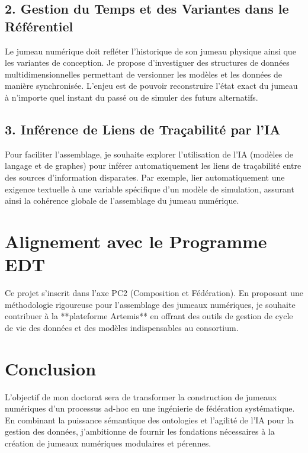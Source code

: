 \documentclass[11pt,a4paper]{article}
\begin{document}
\subsection{2. Gestion du Temps et des Variantes dans le Référentiel}
Le jumeau numérique doit refléter l'historique de son jumeau physique ainsi que les variantes de conception. Je propose d'investiguer des structures de données multidimensionnelles permettant de versionner les modèles et les données de manière synchronisée. L'enjeu est de pouvoir reconstruire l'état exact du jumeau à n'importe quel instant du passé ou de simuler des futurs alternatifs.

\subsection{3. Inférence de Liens de Traçabilité par l'IA}
Pour faciliter l'assemblage, je souhaite explorer l'utilisation de l'IA (modèles de langage et de graphes) pour inférer automatiquement les liens de traçabilité entre des sources d'information disparates. Par exemple, lier automatiquement une exigence textuelle à une variable spécifique d'un modèle de simulation, assurant ainsi la cohérence globale de l'assemblage du jumeau numérique.

\section{Alignement avec le Programme EDT}
Ce projet s'inscrit dans l'axe PC2 (Composition et Fédération). En proposant une méthodologie rigoureuse pour l'assemblage des jumeaux numériques, je souhaite contribuer à la **plateforme Artemis** en offrant des outils de gestion de cycle de vie des données et des modèles indispensables au consortium.

\section{Conclusion}
L'objectif de mon doctorat sera de transformer la construction de jumeaux numériques d'un processus ad-hoc en une ingénierie de fédération systématique. En combinant la puissance sémantique des ontologies et l'agilité de l'IA pour la gestion des données, j'ambitionne de fournir les fondations nécessaires à la création de jumeaux numériques modulaires et pérennes.
\end{document}
